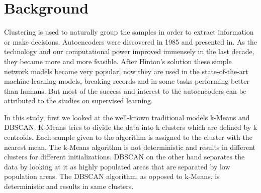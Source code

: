 \documentclass[journal]{IEEEtran}
\begin{document}
\section{Background}
Clustering is used to naturally group the samples in order to extract information or make decisions\cite{jain1999data}.
Autoencoders were discovered in 1985 and presented in\cite{rumelhart1985learning}. As the technology and our computational power improved immensely in the last decade, they became more and more feasible. After Hinton's solution\cite{hinton2006fast} these simple network models became very popular, now they are used in the state-of-the-art machine learning models, breaking records and in some tasks performing better than humans\cite{schmidhuber2015deep}. But most of the success and interest to the autoencoders can be attributed to the studies on supervised learning.\par
In this study, first we looked at the well-known traditional models k-Means\cite{macqueen1967some} and DBSCAN\cite{ester1996density}. K-Means tries to divide the data into k clusters which are defined by k centroids. Each sample given to the algorithm is assigned to the cluster with the nearest mean. The k-Means algorithm is not deterministic and results in different clusters for different initializations. DBSCAN on the other hand separates the data by looking at it as highly populated areas that are separated by low population areas. The DBSCAN algorithm, as opposed to k-Means, is deterministic and results in same clusters.
\end{document}
